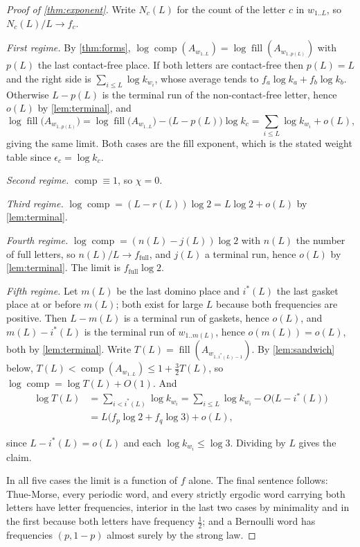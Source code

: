 \documentclass[11pt]{amsart}
\theoremstyle{definition}
\theoremstyle{remark}
\DeclareMathOperator{\comp}{comp}
\DeclareMathOperator{\fil}{fill}
\begin{document}
\begin{proof}[Proof of \cref{thm:exponent}]
Write $N_c(L)$ for the count of the letter $c$ in $w_{1..L}$, so $N_c(L)/L \to f_c$.

\emph{First regime.} By \cref{thm:forms}, $\log\comp(A_{w_{1..L}}) = \log\fil(A_{w_{1..p(L)}})$ with $p(L)$ the last contact-free place. If both letters are contact-free then $p(L) = L$ and the right side is $\sum_{i \le L} \log k_{w_i}$, whose average tends to $f_a \log k_a + f_b \log k_b$. Otherwise $L - p(L)$ is the terminal run of the non-contact-free letter, hence $o(L)$ by \cref{lem:terminal}, and
\[
\log \fil\bigl(A_{w_{1..p(L)}}\bigr) = \log\fil\bigl(A_{w_{1..L}}\bigr) - \bigl(L - p(L)\bigr)\log k_c = \sum_{i\le L} \log k_{w_i} + o(L),
\]
giving the same limit. Both cases are the fill exponent, which is the stated weight table since $\epsilon_c = \log k_c$.

\emph{Second regime.} $\comp \equiv 1$, so $\chi = 0$.

\emph{Third regime.} $\log\comp = (L - r(L))\log 2 = L\log 2 + o(L)$ by \cref{lem:terminal}.

\emph{Fourth regime.} $\log\comp = (n(L) - j(L))\log 2$ with $n(L)$ the number of full letters, so $n(L)/L \to f_{\text{full}}$, and $j(L)$ a terminal run, hence $o(L)$ by \cref{lem:terminal}. The limit is $f_{\text{full}}\log 2$.

\emph{Fifth regime.} Let $m(L)$ be the last domino place and $i^*(L)$ the last gasket place at or before $m(L)$; both exist for large $L$ because both frequencies are positive. Then $L - m(L)$ is a terminal run of gaskets, hence $o(L)$, and $m(L) - i^*(L)$ is the terminal run of $w_{1..m(L)}$, hence $o(m(L)) = o(L)$, both by \cref{lem:terminal}. Write $T(L) = \fil(A_{w_{1..i^*(L)-1}})$. By \cref{lem:sandwich} below, $T(L) < \comp(A_{w_{1..L}}) \le 1 + \tfrac32 T(L)$, so $\log\comp = \log T(L) + O(1)$. And
\begin{align*}
\log T(L) &= \sum_{i < i^*(L)} \log k_{w_i} = \sum_{i \le L} \log k_{w_i} - O\bigl(L - i^*(L)\bigr) \\
&= L\bigl(f_p \log 2 + f_q \log 3\bigr) + o(L),
\end{align*}

since $L - i^*(L) = o(L)$ and each $\log k_{w_i} \le \log 3$. Dividing by $L$ gives the claim.

In all five cases the limit is a function of $f$ alone. The final sentence follows: Thue-Morse, every periodic word, and every strictly ergodic word carrying both letters have letter frequencies, interior in the last two cases by minimality and in the first because both letters have frequency $\tfrac12$; and a Bernoulli word has frequencies $(p, 1-p)$ almost surely by the strong law.
\end{proof}
\end{document}
